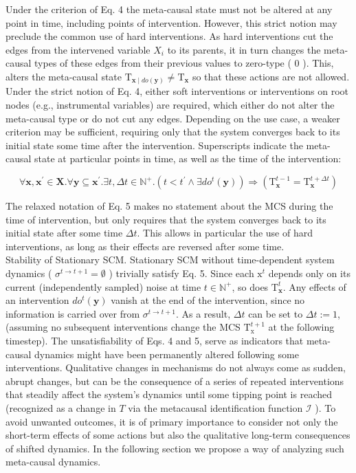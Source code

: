 \documentclass[10pt]{article}
\begin{document}
Under the criterion of Eq. 4 the meta-causal state must not be altered at any point in time, including points of intervention. However, this strict notion may preclude the common use of hard interventions. As hard interventions cut the edges from the intervened variable $X_{i}$ to its parents, it in turn changes the meta-causal types of these edges from their previous values to zero-type ( 0 ). This, alters the meta-causal state $\mathrm{T}_{\mathbf{x} \mid d o(\mathbf{y})} \neq \mathrm{T}_{\mathbf{x}}$ so that these actions are not allowed. Under the strict notion of Eq. 4, either soft interventions or interventions on root nodes (e.g., instrumental variables) are required, which either do not alter the meta-causal type or do not cut any edges. Depending on the use case, a weaker criterion may be sufficient, requiring only that the system converges back to its initial state some time after the intervention. Superscripts indicate the meta-causal state at particular points in time, as well as the time of the intervention:


\begin{equation*}
\forall \mathbf{x}, \mathbf{x}^{\prime} \in \mathbf{X} . \forall \mathbf{y} \subseteq \mathbf{x}^{\prime} . \exists t, \Delta t \in \mathbb{N}^{+} .\left(t<t^{\prime} \wedge \exists d o^{t}(\mathbf{y})\right) \Rightarrow\left(\mathrm{T}_{\mathbf{x}}^{t-1}=\mathrm{T}_{\mathbf{x}}^{t+\Delta t}\right) \tag{5}
\end{equation*}


The relaxed notation of Eq. 5 makes no statement about the MCS during the time of intervention, but only requires that the system converges back to its initial state after some time $\Delta t$. This allows in particular the use of hard interventions, as long as their effects are reversed after some time.\\
Stability of Stationary SCM. Stationary SCM without time-dependent system dynamics ( $\sigma^{t \rightarrow t+1}= \emptyset$ ) trivially satisfy Eq. 5. Since each $\mathrm{x}^{t}$ depends only on its current (independently sampled) noise at time $t \in \mathbb{N}^{+}$, so does $\mathrm{T}_{\mathbf{x}}^{t}$. Any effects of an intervention $d o^{t}(\mathbf{y})$ vanish at the end of the intervention, since no information is carried over from $\sigma^{t \rightarrow t+1}$. As a result, $\Delta t$ can be set to $\Delta t:=1$, (assuming no subsequent interventions change the MCS $\mathrm{T}_{\mathrm{x}}^{t+1}$ at the following timestep). The unsatisfiability of Eqs. 4 and 5, serve as indicators that meta-causal dynamics might have been permanently altered following some interventions. Qualitative changes in mechanisms do not always come as sudden, abrupt changes, but can be the consequence of a series of repeated interventions that steadily affect the system's dynamics until some tipping point is reached (recognized as a change in $T$ via the metacausal identification function $\mathcal{I}$ ). To avoid unwanted outcomes, it is of primary importance to consider not only the short-term effects of some actions but also the qualitative long-term consequences of shifted dynamics. In the following section we propose a way of analyzing such meta-causal dynamics.
\end{document}
